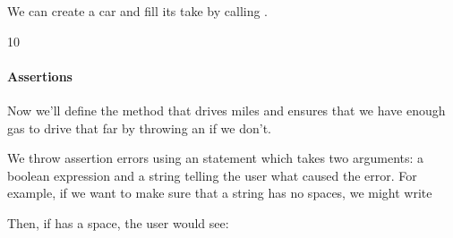 \documentclass[letterpaper,10pt,english]{jupyterBook}
\begin{document}
\sphinxAtStartPar
We can create a car and fill its take by calling .

\begin{sphinxVerbatim}[commandchars=\\\{\}]
      
\end{sphinxVerbatim}

\begin{sphinxVerbatim}[commandchars=\\\{\}]
10
\end{sphinxVerbatim}


\paragraph{Assertions}
\label{\detokenize{content/07-game-theory/python-classes:assertions}}
\sphinxAtStartPar
Now we’ll define the  method that drives  miles and ensures that we have enough gas to drive that far by throwing an  if we don’t.

\sphinxAtStartPar
We throw assertion errors using an  statement which takes two arguments: a boolean expression and a string telling the user what caused the error. For example, if we want to make sure that a string has no spaces, we might write

\begin{sphinxVerbatim}[commandchars=\\\{\}]
     
\end{sphinxVerbatim}

\sphinxAtStartPar
Then, if  has a space, the user would see:

\begin{sphinxVerbatim}[commandchars=\\\{\}]
  
     
\end{sphinxVerbatim}
\end{document}
